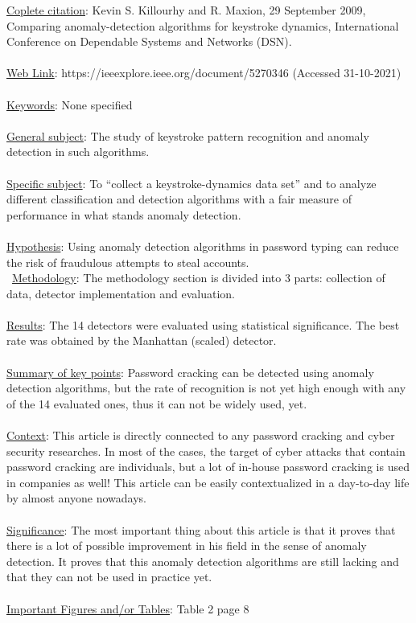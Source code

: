 \documentclass[english]{report}
\begin{document}
\underline{Coplete citation}: Kevin S. Killourhy and R. Maxion, 29 September 2009, Comparing anomaly-detection algorithms for keystroke dynamics, International Conference on Dependable Systems and Networks (DSN).
\\\\
\underline{Web Link}: https://ieeexplore.ieee.org/document/5270346 (Accessed 31-10-2021)
\\\\
\underline{Keywords}: None specified
\\\\
\underline{General subject}: The study of keystroke pattern recognition and anomaly detection in such algorithms.
\\\\
\underline{Specific subject}: To ``collect a keystroke-dynamics data set'' and to analyze different classification and detection algorithms with a fair measure of performance in what stands anomaly detection.
\\\\
\underline{Hypothesis}: Using anomaly detection algorithms in password typing can reduce the risk of fraudulous attempts to steal accounts.
\\\
\underline{Methodology}: The methodology section is divided into 3 parts: collection of data, detector implementation and evaluation.
\\\\
\underline{Results}: The 14 detectors were evaluated using statistical significance. The best rate was obtained by the Manhattan (scaled) detector.
\\\\
\underline{Summary of key points}: Password cracking can be detected using anomaly detection algorithms, but the rate of recognition is not yet high enough with any of the 14 evaluated ones, thus it can not be widely used, yet.
\\\\
\underline{Context}: This article is directly connected to any password cracking and cyber security researches. In most of the cases, the target of cyber attacks that contain password cracking are individuals, but a lot of in-house password cracking is used in companies as well! This article can be easily contextualized in a day-to-day life by almost anyone nowadays.
\\\\
\underline{Significance}: The most important thing about this article is that it proves that there is a lot of possible improvement in his field in the sense of anomaly detection. It proves that this anomaly detection algorithms are still lacking and that they can not be used in practice yet.
\\\\
\underline{Important Figures and/or Tables}: Table 2 page 8
\end{document}
